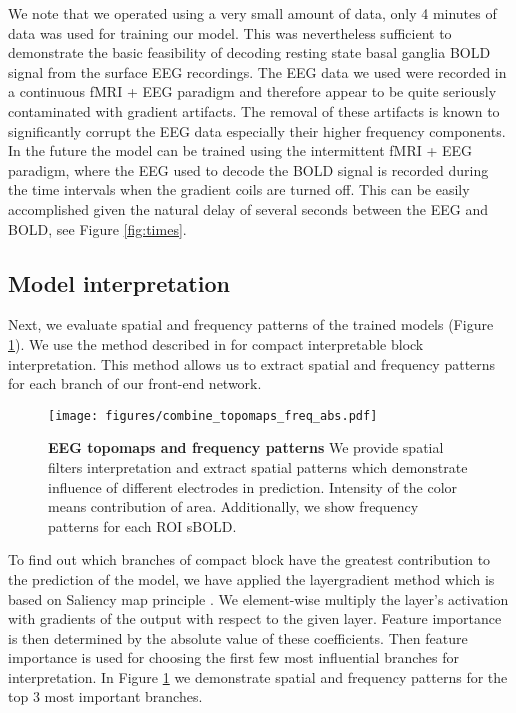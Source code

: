 \documentclass{article}
\begin{document}
We note that we operated using a very small amount of data, only 4 minutes of data was used for training our model. This was nevertheless sufficient to demonstrate the basic feasibility of decoding resting state basal ganglia BOLD signal from the surface EEG recordings. The EEG data we used were recorded in a continuous fMRI + EEG paradigm and therefore appear to be quite seriously contaminated with gradient artifacts. The removal of these artifacts is known to significantly corrupt the EEG data especially their higher frequency components. In the future the model can be trained using the intermittent fMRI + EEG paradigm, where the EEG  used to decode the BOLD signal is recorded during the time intervals when the gradient coils are turned off. This can be easily accomplished given the natural delay of several seconds between the EEG and BOLD, see Figure \ref{fig:times}.







\subsection{Model interpretation}
Next, we evaluate spatial and frequency patterns of the trained models (Figure \ref{fig:topomap}). We use the method described in \cite{petrosyan2021decoding} for compact interpretable block interpretation. This method allows us to extract spatial and frequency patterns for each branch of our front-end network.  

 \begin{figure}[ht]
    \centering
    \texttt{[image: figures/combine\_topomaps\_freq\_abs.pdf]}
    \caption{\label{fig:topomap} \textbf{EEG topomaps and frequency patterns} We provide spatial filters interpretation and extract spatial patterns which demonstrate influence of different electrodes in prediction. Intensity of the color means contribution of area. Additionally, we show frequency patterns for each ROI sBOLD.
     }
\end{figure}

To find out which branches of compact block have the greatest contribution to the prediction of the model, we have applied the layergradient method which is based on Saliency map principle \cite{saliency}. We element-wise multiply the layer's activation with gradients of the output with respect to the given layer. Feature importance is then determined by the absolute value of these coefficients. Then feature importance is used for choosing the first few most influential branches for  interpretation. In Figure \ref{fig:topomap} we demonstrate spatial and frequency patterns for the top 3 most important branches.
\end{document}
